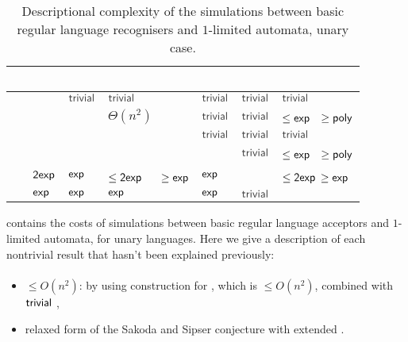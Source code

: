 \begin{table}
	\centering
	\renewcommand{\arraystretch}{1.2}
	\renewcommand{\hstdef}{.55}
	\begin{tabular}{|l|l|l|p{4.3em}|l|l|p{3.1em}|}
		\hline
		~     & \ODFA           & \ONFA           & \TDFA                                            & \TNFA     & \OLA      & \ODLA                          \\ \hline
		\ODFA & \cY             & $\Cctriv$       & $\Cctriv$                                        & $\Cctriv$ & $\Cctriv$ & $\Cctriv$                      \\ \hline
		\ONFA & \rbt{$\CsubEq$} & \cY             & \cR $\Theta(n^2)$                                & $\Cctriv$ & $\Cctriv$ & \cB $\le\Cexp\hst$ $\ge\Cpoly$ \\ \hline
		\TDFA & \rbt{$\CsubEq$} & \rbt{$\CsubEq$} & \cY                                              & $\Cctriv$ & $\Cctriv$ & $\Cctriv$                      \\ \hline
		\TNFA & \rbt{$\CsubEq$} & \rbt{$\CsubEq$} & \cR \rbt[.4]{$\le\Csubln$} \rbt[.3]{$\ge\Cpoly$} & \cY       & $\Cctriv$ & \cB $\le\Cexp\hst$ $\ge\Cpoly$ \\ \hline
		\OLA  & $\Cdexp$        & $\Cexp$         & \cG $\le\Cdexp\hst[1.25]$ $\ge\Cexp$             & $\Cexp$   & \cY       & \cG $\le\Cdexp$ $\ge\Cexp$     \\ \hline
		\ODLA & $\Cexp$         & $\Cexp$         & $\Cexp$                                          & $\Cexp$   & $\Cctriv$ & \cY                            \\ \hline
	\end{tabular}
	\caption{Descriptional complexity of the simulations between basic regular language recognisers and $1$-limited automata, unary case.}
	\label{tab:sims-1la-unary}
\end{table}

 contains the costs of simulations between basic regular language acceptors and $1$-limited automata, for unary languages.
Here we give a description of each nontrivial result that hasn't been explained previously:

\paragraph{\ONFA{}\tto\ODLA}\label{cost:1NFAto1DLAu}
\begin{itemize}
	\item $\le O(n^2)$: by using construction for \hyperref[cost:1NFAto2DFAu]{\ONFA{}\tto\TDFA}, which is $\le O(n^2)$, combined with $\Ctriv$ \TDFA{}\tto\ODLA,
	\item relaxed form of the Sakoda and Sipser conjecture with extended \TDFA.
\end{itemize}
